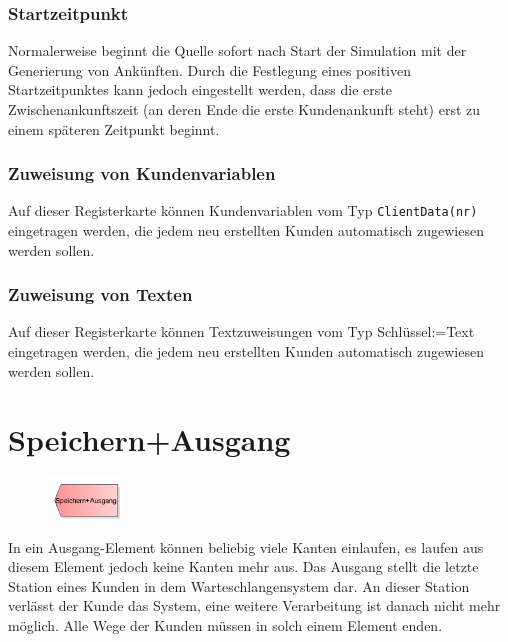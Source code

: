 \subsubsection*{Startzeitpunkt}

Normalerweise beginnt die Quelle sofort nach Start der Simulation mit der Generierung von
Ankünften. Durch die Festlegung eines positiven Startzeitpunktes kann jedoch eingestellt
werden, dass die erste Zwischenankunftszeit (an deren Ende die erste Kundenankunft steht) erst
zu einem späteren Zeitpunkt beginnt.

\subsubsection*{Zuweisung von Kundenvariablen}

Auf dieser Registerkarte können Kundenvariablen vom Typ \texttt{ClientData(nr)} eingetragen werden,
die jedem neu erstellten Kunden automatisch zugewiesen werden sollen.

\subsubsection*{Zuweisung von Texten}

Auf dieser Registerkarte können Textzuweisungen vom Typ Schlüssel:=Text eingetragen werden,
die jedem neu erstellten Kunden automatisch zugewiesen werden sollen.


\section{Speichern+Ausgang}
\label{ref:ModelElementDisposeWithTable}

\begin{figure}
\vspace{-22pt}
\includegraphics[width=2cm]{imageModelElementDisposeWithTable.png}
\vspace{-22pt}
\end{figure}

In ein Ausgang-Element können beliebig viele Kanten einlaufen, es laufen aus diesem Element jedoch keine Kanten mehr aus.
Das Ausgang stellt die letzte Station eines Kunden in dem Warteschlangensystem dar. An dieser Station verlässt der Kunde
das System, eine weitere Verarbeitung ist danach nicht mehr möglich. Alle Wege der Kunden müssen in solch einem Element enden.

